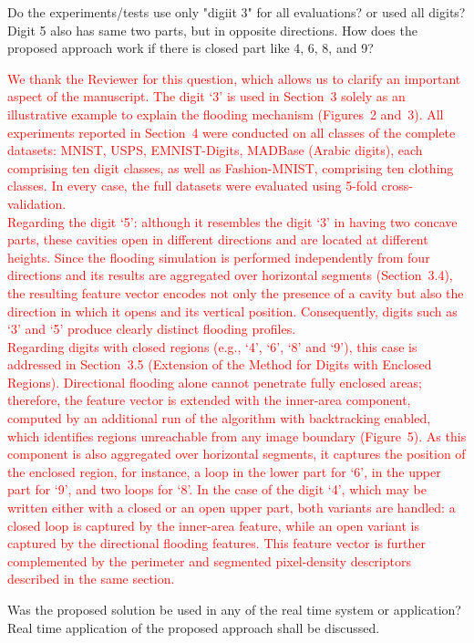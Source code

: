 \documentclass{ar2rc}
\begin{document}
\RC %
Do the experiments/tests use only "digiit 3" for all evaluations? or used all digits? Digit 5 also has same two parts, but in opposite directions. How does the proposed approach work if there is closed part like 4, 6, 8, and 9?

\AR
\textcolor{red}{We thank the Reviewer for this question, which allows us to clarify an important aspect of the manuscript. The digit `3' is used in Section~3 solely as an illustrative example to explain the flooding mechanism (Figures~2 and~3). All experiments reported in Section~4 were conducted on all classes of the complete datasets: MNIST, USPS, EMNIST-Digits, MADBase (Arabic digits), each comprising ten digit classes, as well as Fashion-MNIST, comprising ten clothing classes. In every case, the full datasets were evaluated using 5-fold cross-validation. \\
Regarding the digit `5': although it resembles the digit `3' in having two concave parts, these cavities open in different directions and are located at different heights. Since the flooding simulation is performed independently from four directions and its results are aggregated over horizontal segments (Section~3.4), the resulting feature vector encodes not only the presence of a cavity but also the direction in which it opens and its vertical position. Consequently, digits such as `3' and `5' produce clearly distinct flooding profiles. \\
Regarding digits with closed regions (e.g., `4', `6', `8' and `9'), this case is addressed in Section~3.5 (Extension of the Method for Digits with Enclosed Regions). Directional flooding alone cannot penetrate fully enclosed areas; therefore, the feature vector is extended with the inner-area component, computed by an additional run of the algorithm with backtracking enabled, which identifies regions unreachable from any image boundary (Figure~5). As this component is also aggregated over horizontal segments, it captures the position of the enclosed region, for instance, a loop in the lower part for `6', in the upper part for `9', and two loops for `8'. In the case of the digit `4', which may be written either with a closed or an open upper part, both variants are handled: a closed loop is captured by the inner-area feature, while an open variant is captured by the directional flooding features. This feature vector is further complemented by the perimeter and segmented pixel-density descriptors described in the same section.}


\RC %
Was the proposed solution be used in any of the real time system or application? Real time application of the proposed approach shall be discussed.
\end{document}
